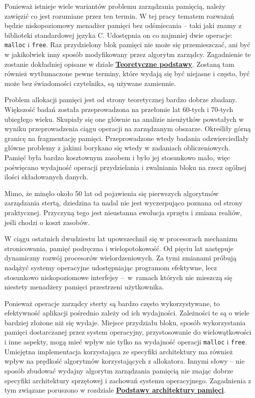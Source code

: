 \documentclass[12pt,a4paper,titlepage,twoside]{mwart}
\begin{document}
Ponieważ istnieje wiele wariantów problemu zarządzania pamięcią, należy
zawięzić co jest rozumiane przez ten termin. W tej pracy tematem rozważań
będzie niskopoziomowy menadżer pamięci bez odśmiecania -- taki jaki znamy z
biblioteki standardowej języka C. Udostępnia on co najmniej dwie operacje:
\texttt{malloc} i \texttt{free}. Raz przydzielony blok pamięci nie może się
przemieszczać, ani być w jakikolwiek inny sposób modyfikowany przez algorytm
zarządcy. Zagadnienie te zostanie dokładniej opisane w dziale
\hyperlink{Teoria}{\textbf{Teoretyczne podstawy}}. Zostaną tam również
wytłumaczone pewne terminy, które wydają się być niejasne i często, być może bez
świadomości czytelnika, są używane zamiennie.

Problem allokacji pamięci jest od strony teoretycznej bardzo dobrze zbadany.
Większość badań została przeprowadzona na przełomie lat 60-tych i 70-tych
ubiegłego wieku. Skupiały się one głównie na analizie nieużytków powstałych w
wyniku przeprowadzenia ciągu operacji na zarządzanym obszarze. Określiły górną
granicę na fragmentację pamięci. Przeprowadzone wtedy badania odzwierciedlały
główne problemy z jakimi borykano się wtedy w zadaniach obliczeniowych. Pamięć
była bardzo kosztownym zasobem i było jej stosunkowo mało, więc poświęcano
wydajność operacji przydzielania i zwalniania bloku na rzecz ogólnej ilości
składowanych danych.

Mimo, że minęło około 50 lat od pojawienia się pierwszych algorytmów
zarządzania stertą, dziedzina ta nadal nie jest wyczerpująco poznana od strony
praktycznej. Przyczyną tego jest nieustanna ewolucja sprzętu i zmiana realiów,
jeśli chodzi o koszt zasobów.

W ciągu ostatnich dwudziestu lat upowszechnił się w procesorach mechanizm
stronicowania, pamięć podręczna i wielopotokowość. Od pięciu lat następuje
dynamiczny rozwój procesorów wielordzeniowych. Za tymi zmianami próbują nadążyć
systemy operacyjne udostępniając programom efektywne, lecz stosunkowo
niskopoziomowe interfejsy --~w~ramach których nie mieszczą się niestety
menadżery pamięci przestrzeni użytkownika.

Ponieważ operacje zarządcy sterty są bardzo często wykorzystywane, to
efektywność aplikacji pośrednio zależy od ich wydajności. Zależności te są o
wiele bardziej złożone niż się wydaje. Miejsce przydziału bloku, sposób
wykorzystania pamięci dostarczanej przez system operacyjny, przystosowanie do
wielowątkowości i inne aspekty, mogą mieć wpływ nie tylko na wydajność operacji
\texttt{malloc} i \texttt{free}. Umiejętna implementacja korzystająca ze
specyfiki architektury ma również wpływ na prędkość algorytmów korzystających z
allokatora. Innymi słowy -- nie sposób zbudować wydajny algorytm zarządzania
pamięcią nie znając dobrze specyfiki architektury sprzętowej i zachowań systemu
operacyjnego. Zagadnienia z tym związane poruszono w rozdziale
\hyperlink{Architektura}{\textbf{Podstawy architektury pamięci}}.
\end{document}
